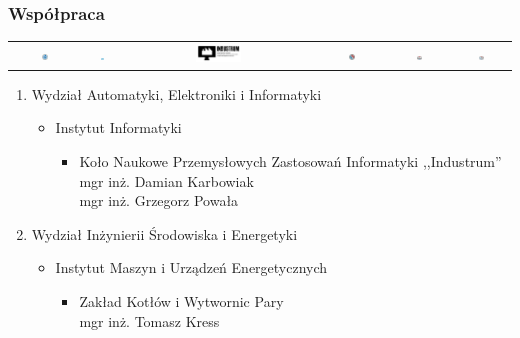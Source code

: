 \documentclass[ucs]{beamer}
\begin{document}
\begin{frame}
\frametitle{Współpraca}
\begin{center}
\begin{tabular}{cccccc}
\includegraphics[width=0.1\textwidth]{images/AEiILogo} &
\includegraphics[width=0.1\textwidth]{images/IILogo} &
\includegraphics[width=0.25\textwidth]{images/SKNIndustrumLogo} &
\includegraphics[width=0.1\textwidth]{images/WISiELogo} &
\includegraphics[width=0.1\textwidth]{images/IMIUELogo} &
\includegraphics[width=0.1\textwidth]{images/ZKiWPLogo} \\ 
\end{tabular} 
\end{center}

\begin{enumerate}
\item Wydział Automatyki, Elektroniki i Informatyki
\begin{itemize}
\item Instytut Informatyki
\begin{itemize}
\item Koło Naukowe Przemysłowych Zastosowań Informatyki ,,Industrum''
\\ mgr inż. Damian Karbowiak
\\ mgr inż. Grzegorz Powała
\end{itemize}
\end{itemize}
\item  Wydział Inżynierii Środowiska i Energetyki
\begin{itemize}
\item Instytut Maszyn i Urządzeń Energetycznych
\begin{itemize}
\item Zakład Kotłów i Wytwornic Pary
\\ mgr inż. Tomasz Kress
\end{itemize}
\end{itemize}
\end{enumerate}
\end{frame}
\end{document}
